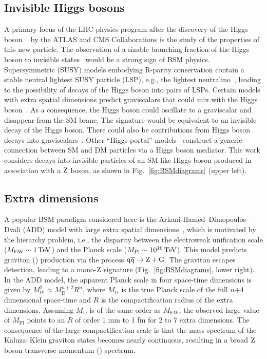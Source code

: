\subsection{Invisible Higgs bosons}

A primary focus of the LHC physics program after the discovery of the Higgs boson ~\cite{AtlasPaperCombination,CMSPaperCombination} by
the ATLAS and CMS Collaborations is the study of the properties of this new particle. The observation of a sizable branching
fraction of the Higgs boson to invisible states~\cite{Ghosh:2012ep,Martin:1999qf,Bai:2011wz} would be a strong sign
of BSM physics.  Supersymmetric (SUSY) models embodying R-parity conservation contain a stable neutral lightest SUSY
particle (LSP), e.g., the lightest neutralino~\cite{Belanger:2001am}, leading to the possibility of decays of the Higgs boson into pairs of LSPs.
Certain models with extra spatial dimensions predict graviscalars that could mix with the
Higgs boson~\cite{Giudice:2000av}.  As a consequence, the Higgs boson could oscillate
to a graviscalar and disappear from the SM brane. The signature would be
equivalent to an invisible decay of the Higgs boson. There could also be contributions
from Higgs boson decays into graviscalars~\cite{Battaglia:2004js}.
Other ``Higgs portal'' models~\cite{Baek:2012se,Djouadi:2011aa,Djouadi:2012zc} construct
a generic connection between SM and DM particles via a Higgs boson mediator.
This work considers decays into invisible particles of an SM-like Higgs boson produced in association with a $\mathrm{Z}$ boson, as shown in Fig.~\ref{fig:BSMdiagrams} (upper left).

\subsection{Extra dimensions}

A popular BSM paradigm considered here is the Arkani-Hamed--Dimopoulos--Dvali (ADD) model with large extra spatial dimensions~\cite{arkani98:hlz,arkani99:hlz,han99:hlz}, which
is motivated by the hierarchy problem, i.e., the disparity between the electroweak unification
scale ($M_\mathrm{EW} \sim 1\,\text{Te\hspace{-.08em}V}$) and the Planck scale ($M_\mathrm{Pl} \sim 10^{16}\,\text{Te\hspace{-.08em}V}$).
This model predicts graviton (\cPG) production via the process $\mathrm{q}\overline{\mathrm{q}} \rightarrow \mathrm{Z} + \mathrm{G}$. The graviton escapes
detection, leading to a mono-$\mathrm{Z}$ signature (Fig.~\ref{fig:BSMdiagrams}, lower right).
In the ADD model, the apparent Planck scale in four space-time dimensions
is given by $M_\mathrm{Pl}^2 \approx M_\mathrm{D}^{n+2}R^n$, where $M_\mathrm{D}$ is the true Planck scale of
the full $n$+4 dimensional space-time and $R$ is the compactification radius of the extra
dimensions. Assuming $M_\mathrm{D}$ is of the same order as $M_\mathrm{EW}$, the observed large value
of $M_\mathrm{Pl}$ points to an $R$ of order 1 mm to 1 fm for 2 to 7 extra dimensions. The consequence of
the large compactification scale is that the mass spectrum of the Kaluza--Klein graviton states
becomes nearly continuous, resulting in a broad $\mathrm{Z}$ boson transverse momentum (\PT) spectrum.

